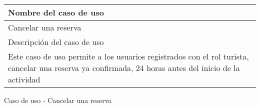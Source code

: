 \begin{identificacionCasoDeUso}
	\begin{tabular} { | p{17cm} |}

		\hline
		Nombre del caso de uso                                                                                                                                \\ \hline
		Cancelar una reserva                                                                                                                                  \\ \hline
		Descripción del caso de uso                                                                                                                           \\ \hline
		Este caso de uso permite a los usuarios registrados con el rol turista, cancelar una reserva ya confirmada, 24 horas antes del inicio de la actividad \\ \hline
	\end{tabular}
	\caption{Caso de uso - Cancelar una reserva}
\end{identificacionCasoDeUso}